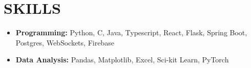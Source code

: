 \section*{SKILLS}
\noindent
\begin{itemize}
	\item \textbf{Programming:} Python, C, Java, Typescript, React, Flask, Spring Boot, Postgres, WebSockets, Firebase
	\item \textbf{Data Analysis:} Pandas, Matplotlib, Excel, Sci-kit Learn, PyTorch
\end{itemize}
